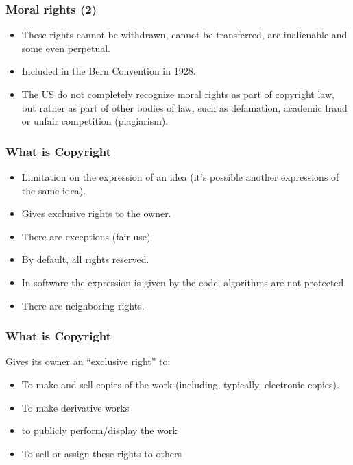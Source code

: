 
\begin{frame}
\frametitle{Moral rights (2)}

\begin{itemize}
\item These rights cannot be withdrawn, cannot be transferred, are inalienable
and some even perpetual.
\item Included in the Bern Convention in 1928. 
\item The US do not completely recognize moral rights as part of copyright law, but rather as part of other bodies of law, such as defamation, academic fraud or unfair competition (plagiarism).
\end{itemize}


\end{frame}





\begin{frame}
\frametitle{What is Copyright}

\begin{itemize}
\item Limitation on the \alert{expression} of an idea (it's possible another expressions of the same idea).
\item Gives exclusive rights to the owner.
\item There are exceptions (fair use)
\item By default, all rights reserved.
\item In software the expression is given by the code; algorithms are
not protected.
\item There are neighboring rights.
\end{itemize}

\end{frame}



\begin{frame}
\frametitle{What is Copyright}

Gives its owner an ``exclusive right'' to:

\begin{itemize}
\item To make and sell copies of the work (including,
typically, electronic copies).
\item To make derivative works
\item to publicly perform/display the work
\item To sell or assign these rights to others
\end{itemize}

\end{frame}

